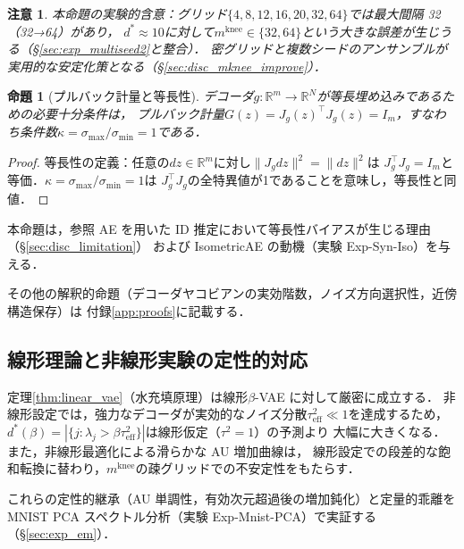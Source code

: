 \documentclass[11pt,a4paper]{jsarticle}
\newtheorem{proposition}{命題}
\newtheorem{remark}{注意}
\newcommand{\Jg}{J_g}
\newcommand{\R}{\mathbb{R}}
\newcommand{\kap}{\kappa}
\newcommand{\mknee}{m^{\mathrm{knee}}}
\begin{document}
\begin{remark}
本命題の実験的含意：グリッド$\{4,8,12,16,20,32,64\}$では最大間隔 32（32→64）があり，
$d^* \approx 10$に対して$\mknee \in \{32, 64\}$という大きな誤差が生じうる（§\ref{sec:exp_multiseed2}と整合）．
密グリッドと複数シードのアンサンブルが実用的な安定化策となる（§\ref{sec:disc_mknee_improve}）．
\end{remark}

\begin{proposition}[プルバック計量と等長性]\label{thm:pullback}
デコーダ$g: \R^m \to \R^N$が等長埋め込みであるための必要十分条件は，
プルバック計量$G(z) = \Jg(z)^\top \Jg(z) = I_m$，すなわち条件数$\kap = \sigma_{\max}/\sigma_{\min} = 1$である．
\end{proposition}

\begin{proof}
等長性の定義：任意の$dz \in \R^m$に対し$\|J_g dz\|^2 = \|dz\|^2$は
$J_g^\top J_g = I_m$と等価．$\kap = \sigma_{\max}/\sigma_{\min} = 1$は
$J_g^\top J_g$の全特異値が1であることを意味し，等長性と同値．
\end{proof}

本命題は，参照 AE を用いた ID 推定において等長性バイアスが生じる理由（§\ref{sec:disc_limitation}）
および IsometricAE の動機（実験 Exp-Syn-Iso）を与える．

その他の解釈的命題（デコーダヤコビアンの実効階数，ノイズ方向選択性，近傍構造保存）は
付録\ref{app:proofs}に記載する．

\subsection{線形理論と非線形実験の定性的対応}\label{sec:theory_bridge}

定理\ref{thm:linear_vae}（水充填原理）は線形$\beta$-VAE に対して厳密に成立する．
非線形設定では，強力なデコーダが実効的なノイズ分散$\tau^2_\mathrm{eff} \ll 1$を達成するため，
$d^*(\beta) = |\{j : \lambda_j > \beta\tau^2_\mathrm{eff}\}|$は線形仮定（$\tau^2=1$）の予測より
大幅に大きくなる．また，非線形最適化による滑らかな AU 増加曲線は，
線形設定での段差的な飽和転換に替わり，$\mknee$の疎グリッドでの不安定性をもたらす．

これらの定性的継承（AU 単調性，有効次元超過後の増加鈍化）と定量的乖離を
MNIST PCA スペクトル分析（実験 Exp-Mnist-PCA）で実証する（§\ref{sec:exp_em}）．
\end{document}
